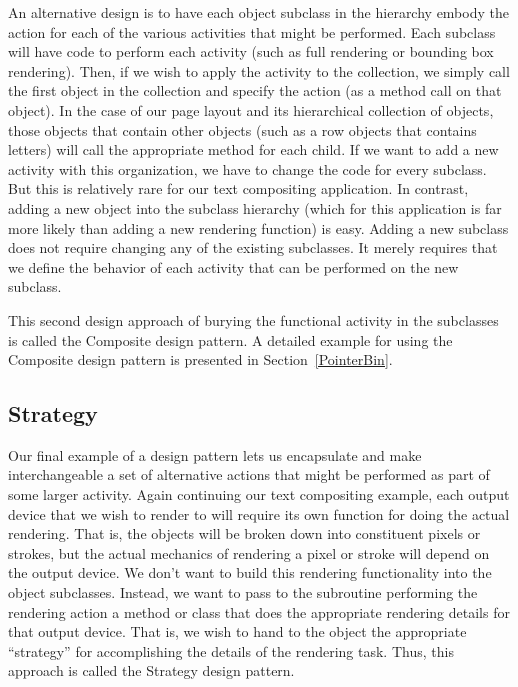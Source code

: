 An alternative design is to have each object subclass in the hierarchy
embody the action for each of the various activities that might be
performed.
Each subclass will have code to perform each activity
(such as full rendering or bounding box rendering).
Then, if we wish to apply the activity to the collection, we simply
call the first object in the collection and specify the action (as a
method call on that object).
In the case of our page layout and its hierarchical collection of
objects, those objects that contain other objects (such as a row
objects that contains letters) will call the appropriate method for
each child.
If we want to add a new activity with this organization, we have to
change the code for every subclass.
But this is relatively rare for our text compositing application.
In contrast, adding a new object into the subclass hierarchy (which
for this application is far more likely than adding a new rendering
function) is easy.
Adding a new subclass does not require changing any of the existing
subclasses.
It merely requires that we define the behavior of each activity that
can be performed on the new subclass.

This second design approach of burying the functional activity in the
subclasses is called the Composite design pattern.
A detailed example for using the Composite design pattern is presented
in Section~\ref{PointerBin}.

\subsection{Strategy}
\label{StrategyPatt}

Our final example of a design pattern lets us encapsulate and make
interchangeable a set of alternative actions that
might be performed as part of some larger activity.
Again continuing our text compositing example, each output device that
we wish to render to will require its own function for doing the
actual rendering.
That is, the objects will be broken down into constituent pixels or
strokes, but the actual mechanics of rendering a pixel or stroke will
depend on the output device.
We don't want to build this rendering functionality into the object
subclasses.
Instead, we want to pass to the subroutine performing the rendering
action a method or class that does the appropriate rendering details
for that output device.
That is, we wish to hand to the object the appropriate ``strategy''
for accomplishing the details of the rendering task.
Thus, this approach is called the Strategy design pattern.

